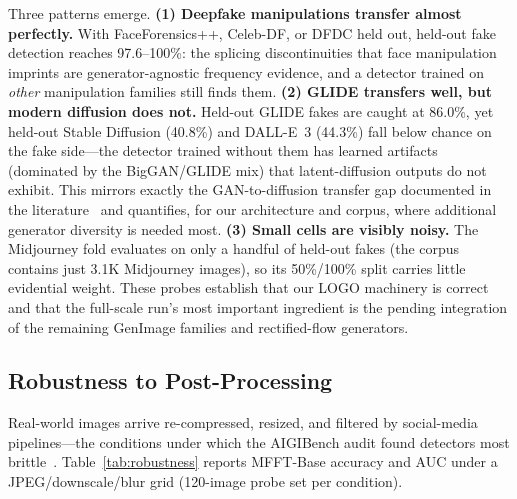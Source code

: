 \documentclass[journal]{IEEEtran}
\begin{document}
Three patterns emerge. \textbf{(1) Deepfake manipulations transfer almost perfectly.} With FaceForensics++, Celeb-DF, or DFDC held out, held-out fake detection reaches 97.6--100\%: the splicing discontinuities that face manipulation imprints are generator-agnostic frequency evidence, and a detector trained on \emph{other} manipulation families still finds them. \textbf{(2) GLIDE transfers well, but modern diffusion does not.} Held-out GLIDE fakes are caught at 86.0\%, yet held-out Stable Diffusion (40.8\%) and DALL-E~3 (44.3\%) fall below chance on the fake side---the detector trained without them has learned artifacts (dominated by the BigGAN/GLIDE mix) that latent-diffusion outputs do not exhibit. This mirrors exactly the GAN-to-diffusion transfer gap documented in the literature~\cite{corvi2023,ojha2023,zhu2023genimage} and quantifies, for our architecture and corpus, where additional generator diversity is needed most. \textbf{(3) Small cells are visibly noisy.} The Midjourney fold evaluates on only a handful of held-out fakes (the corpus contains just 3.1K Midjourney images), so its 50\%/100\% split carries little evidential weight. These probes establish that our LOGO machinery is correct and that the full-scale run's most important ingredient is the pending integration of the remaining GenImage families and rectified-flow generators.

\subsection{Robustness to Post-Processing}
\label{sec:robustness}
Real-world images arrive re-compressed, resized, and filtered by social-media pipelines---the conditions under which the AIGIBench audit found detectors most brittle~\cite{li2025aigibench}. Table~\ref{tab:robustness} reports MFFT-Base accuracy and AUC under a JPEG/downscale/blur grid (120-image probe set per condition).
\end{document}
